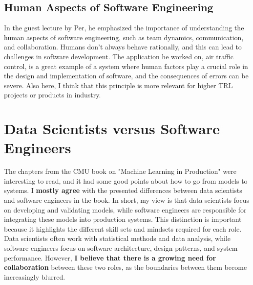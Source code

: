 \documentclass[a4paper,11pt]{article}
\begin{document}
\subsection{Human Aspects of Software Engineering}
In the guest lecture by Per, he emphasized the importance of understanding the human aspects of software engineering, such as team dynamics, communication, and collaboration. 
Humans don't always behave rationally, and this can lead to challenges in software development.
The application he worked on, air traffic control, is a great example of a system where human factors play a crucial role in the design and implementation of software, and the consequences of errors can be severe.
Also here, I think that this principle is more relevant for higher TRL projects or products in industry.


\section{Data Scientists versus Software Engineers}
The chapters from the CMU book on "Machine Learning in Production" \cite{MLinProd} were interesting to read, and it had some good points about how to go from models to systems.
I \textbf{mostly agree} with the presented differences between data scientists and software engineers in the book.
In short, my view is that data scientists focus on developing and validating models, while software engineers are responsible for integrating these models into production systems. This distinction is important because it highlights the different skill sets and mindsets required for each role. Data scientists often work with statistical methods and data analysis, while software engineers focus on software architecture, design patterns, and system performance. However, \textbf{I believe that there is a growing need for collaboration} between these two roles, as the boundaries between them become increasingly blurred.
\end{document}
